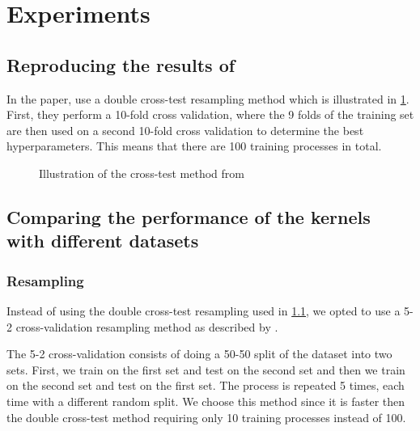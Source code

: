 \section{Experiments}

\subsection{Reproducing the results of \textcite{frenayParameterinsensitiveKernelExtreme2011}}
\label{sec:reproducing-frenay}


In the paper, \textcite{frenayParameterinsensitiveKernelExtreme2011} use a double cross-test resampling
method which is illustrated in \cref{fig:frenay-cross-test}. First, they perform a 10-fold cross validation,
where the 9 folds of the training set are then used on a second 10-fold cross validation to determine the
best hyperparameters. This means that there are 100 training processes in total.

\begin{figure}[H]
    
	\caption{Illustration of the cross-test method from \cite{frenayParameterinsensitiveKernelExtreme2011}}
	\label{fig:frenay-cross-test}
\end{figure}


\subsection{Comparing the performance of the kernels with different datasets}

\subsubsection{Resampling}

Instead of using the double cross-test resampling used in \cref{sec:reproducing-frenay},
we opted to use a 5-2 cross-validation resampling method as described by \textcite{dietterichApproximateStatisticalTests1998}.

The 5-2 cross-validation
consists of doing a 50-50 split of the dataset into two sets. First, we train on the first set and test on the second set
and then we train on the second set and test on the first set. The process is repeated 5 times, each time
with a different random split. We choose this method since it is faster then the double cross-test method
requiring only 10 training processes instead of 100.



\begin{figure}
    
\end{figure}
